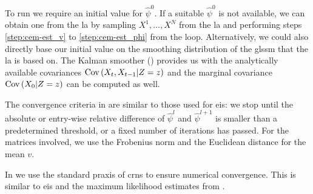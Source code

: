 To run  we require an initial value for $\hat\psi^{0}$. If a suitable $\hat\psi^{0}$ is not available, we can obtain one from the \gls{la} by sampling $X^{1}, \dots, X^{N}$ from the \gls{la} and performing steps \ref{step:cem-est_v} to \ref{step:cem-est_phi} from the loop.
Alternatively, we could also directly base our initial value on the smoothing distribution of the \gls{glssm} that the \gls{la} is based on. The Kalman smoother () provides us with the analytically available covariances $\operatorname{Cov} \left( X_{t}, X_{t - 1} | Z = z \right)$ and the marginal covariance $\operatorname{Cov} \left( X_{0} | Z = z \right)$ can be computed as well. 

The convergence criteria in  are similar to those used for \gls{eis}: we stop until the absolute or entry-wise relative difference of $\hat\psi^{l}$ and $\hat \psi^{l + 1}$ is smaller than a predetermined threshold, or a fixed number of iterations has passed. For the matrices involved, we use the Frobenius norm and the Euclidean distance for the mean $v$. 

In  we use the standard praxis of \glspl{crn} to ensure numerical convergence. This is similar to \gls{eis} and the maximum likelihood estimates from .

